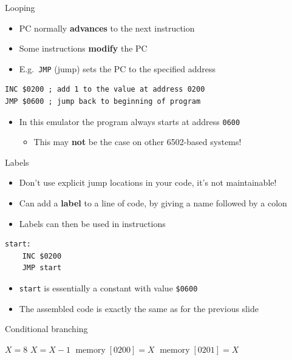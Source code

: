 \begin{frame}[fragile]{Looping}
	\begin{itemize}
		\pause\item PC normally \textbf{advances} to the next instruction
		\pause\item Some instructions \textbf{modify} the PC
		\pause\item E.g.\ \lstinline{JMP} (jump) sets the PC to the specified address
	\end{itemize}
	\pause
	\begin{lstlisting}
INC $0200 ; add 1 to the value at address 0200
JMP $0600 ; jump back to beginning of program
	\end{lstlisting}
	\begin{itemize}
		\pause\item In this emulator the program always starts at address \texttt{0600}
			\begin{itemize}
				\item This may \textbf{not} be the case on other 6502-based systems!
			\end{itemize}
	\end{itemize}
\end{frame}

\begin{frame}[fragile]{Labels}
	\begin{itemize}
		\pause\item Don't use explicit jump locations in your code, it's not maintainable!
		\pause\item Can add a \textbf{label} to a line of code, by giving a name followed by a colon
		\pause\item Labels can then be used in instructions
	\end{itemize}
	\pause
	\begin{lstlisting}
start:
    INC $0200
    JMP start
	\end{lstlisting}
	\begin{itemize}
		\pause\item \lstinline{start} is essentially a constant with value \lstinline{$0600}
		\pause\item The assembled code is exactly the same as for the previous slide
	\end{itemize}
\end{frame}

\begin{frame}[fragile]{Conditional branching}
	\pause
	
	\pause
	\begin{algorithmic}
		\State $X = 8$
		\Do
			\State $X = X-1$
			\State $\operatorname{memory}[0200] = X$
		\State $\operatorname{memory}[0201] = X$
	\end{algorithmic}
\end{frame}

